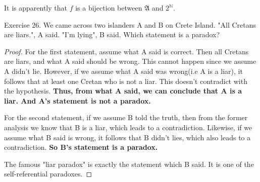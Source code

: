 \documentclass[UTF8, a4paper, linespread=1.5]{article}
\begin{document}
It is apparently that $f$ is a bijection between $\mathfrak A$ and $2^{\mathbb N}$.


\begin{thm}{Exercise 26.}{}
    We came across two islanders A and B on Crete Island. "All Cretans are liars.", A said. "I'm lying", B said. Which statement is a paradox?
\end{thm}

\begin{proof}
    For the first statement, assume what A said is correct. Then all Cretans are liars, and what A said should be wrong. This cannot happen since we assume A didn't lie. However, if we assume what A said was wrong(i.e A is a liar), it follows that at least one Cretan who is not a liar. This doesn't contradict with the hypothesis. \textbf{Thus, from what A said, we can conclude that A is a liar. And A's statement is not a paradox.}

    For the second statement, if we assume B told the truth, then from the former analysis we know that B is a liar, which leads to a contradiction. Likewise, if we assume what B said is wrong, it follows that B didn't lies, which also leads to a contradiction. \textbf{So B's statement is a paradox.}

    The famous "liar paradox" is exactly the statement which B said. It is one of the self-referential paradoxes.
\end{proof}
\end{document}
